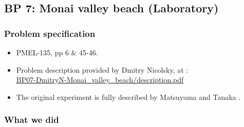 
\subsection{BP 7:
 Monai valley beach (Laboratory)}

\subsubsection{Problem specification}

\begin{itemize}

\item PMEL-135, pp 6 \& 45-46.

\item Problem description provided by Dmitry Nicolsky, 
at \cite{bp-description}: \\
\href{https://github.com/rjleveque/nthmp-benchmark-problems/blob/master/BP07-DmitryN-Monai_valley_beach/description.pdf}{BP07-DmitryN-Monai\_valley\_beach/description.pdf}

\item The original experiment is fully described by Matsuyama and Tanaka
\cite{MatsuyamaTanaka:monai}.

\end{itemize} 

\subsubsection{What we did}

